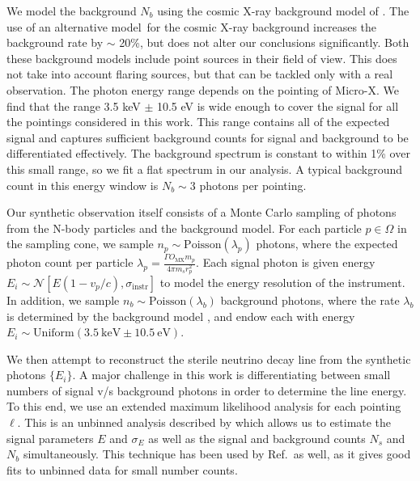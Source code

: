 \documentclass[aps,prd,10pt,twocolumn,superscriptaddress,showpacs,footinbib]{revtex4-1}
\newcommand{\units}[1]{~\mathrm{#1}}
\begin{document}
We model the background $N_b$ using the cosmic X-ray background model of \cite{Ajello:2008xb}.  The
use of an alternative model\,\cite{2009A&A...493..501M} for the cosmic X-ray background increases the background rate by $\sim$ 20\%, but does not alter our
conclusions significantly.  Both these background models include point sources in their field of view.  This does not take into account flaring sources, but that can be tackled only with a real observation.  The photon energy range depends on the pointing of Micro-X.  We find that the range 3.5 keV $\pm$ 10.5 eV is wide enough to cover the signal for all the pointings considered in this work.
 This range contains all of the expected signal and captures
sufficient background counts for signal and background to be differentiated effectively. The
background spectrum is constant to within 1\% over this small range, so we fit a flat spectrum in
our analysis. A typical background count in this energy window is $N_b \sim 3$ photons per pointing.

Our synthetic observation itself consists of a Monte Carlo sampling of photons from the N-body particles
and the background model. For each particle $p \in \Omega$ in the sampling cone, we sample $n_p \sim
\mathrm{Poisson}(\lambda_p)$ photons, where the expected photon count per particle
$\lambda_p=\frac{\Gamma O_\mathrm{MX}m_p}{4\pi m_s r_p^2}$.
Each signal photon is given energy $E_i \sim \mathcal{N}[E(1-v_p/c),
\sigma_\mathrm{instr}]$ to model the energy resolution of the instrument. In
addition, we sample $n_b \sim \mathrm{Poisson}(\lambda_b)$ background photons, where the rate $\lambda_b$ is
determined by the background model \cite{Ajello:2008xb}, and endow each with energy
$E_i \sim \mathrm{Uniform}(3.5\units{keV}\pm10.5\units{eV})$. 

We then attempt to reconstruct the sterile neutrino decay line from the synthetic photons $\{E_i\}$.
A major challenge in this work is differentiating between small numbers of signal v/s background photons in
order to determine the line energy. To this end, we use an extended maximum likelihood analysis for
each pointing $\ell$.  This is an unbinned analysis described by \cite{barlow1990} which allows us to estimate
the signal parameters $E$ and $\sigma_E$ as well as the signal and background counts $N_s$
and $N_b$ simultaneously. This technique has been used by Ref.\,\cite{Figueroa-Feliciano:2015gwa} as well, as it gives
good fits to unbinned data for small number counts. 
\end{document}
